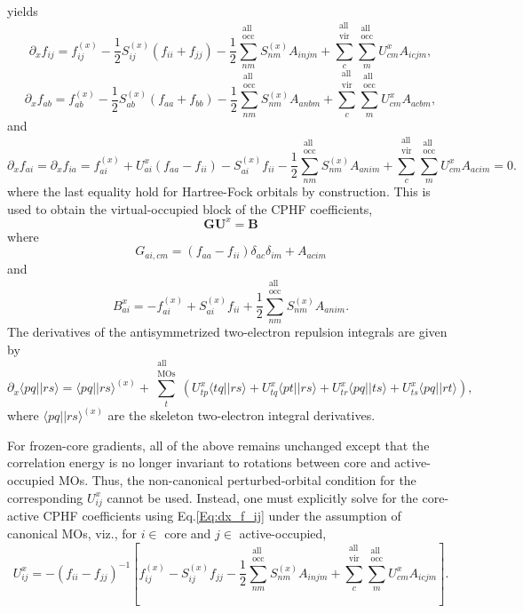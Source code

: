 \documentclass[12pt]{article}
\def\ket#1{| #1 \rangle}
\def\bra#1{\langle #1 |}
\def\aint#1#2{\bra{#1}\ket{#2}}
\newcommand{\allocc}{\substack{\textrm{all}{}\\\textrm{occ}}}
\newcommand{\allvir}{\substack{\textrm{all}{}\\\textrm{vir}}}
\newcommand{\allmos}{\substack{\textrm{all}{}\\\textrm{MOs}}}
\begin{document}
yields
\begin{equation}
\partial_x f_{ij} = f_{ij}^{(x)} - \frac{1}{2} S_{ij}^{(x)} (f_{ii} + f_{jj})
- \frac{1}{2} \sum_{nm}^{\allocc} S_{nm}^{(x)} A_{injm}
+ \sum_c^{\allvir} \sum_m^{\allocc} U_{cm}^x A_{icjm},
    \label{Eq:dx_f_ij}
\end{equation}
\begin{equation}
\partial_x f_{ab} = f_{ab}^{(x)} - \frac{1}{2} S_{ab}^{(x)} (f_{aa} + f_{bb})
- \frac{1}{2} \sum_{nm}^{\allocc} S_{nm}^{(x)} A_{anbm}
+ \sum_c^{\allvir} \sum_m^{\allocc} U_{cm}^x A_{acbm},
\end{equation}
and
\begin{equation}
\partial_x f_{ai} = \partial_x f_{ia} = f_{ai}^{(x)} + U_{ai}^x (f_{aa} - f_{ii}) - S_{ai}^{(x)} f_{ii} 
- \frac{1}{2} \sum_{nm}^{\allocc} S_{nm}^{(x)} A_{anim}
+ \sum_c^{\allvir} \sum_m^{\allocc} U_{cm}^x A_{acim} = 0.
\end{equation}
where the last equality hold for Hartree-Fock orbitals by construction.  This
is used to obtain the virtual-occupied block of the CPHF coefficients,
\begin{equation}
\mathbf{G} \mathbf{U}^x = \mathbf{B}
\end{equation}
where
\begin{equation}
G_{ai,cm} = (f_{aa} - f_{ii}) \delta_{ac} \delta_{im} + A_{acim}
\end{equation}
and
\begin{equation}
B_{ai}^x = -f_{ai}^{(x)} + S_{ai}^{(x)} f_{ii} + \frac{1}{2} \sum_{nm}^{\allocc} S_{nm}^{(x)} A_{anim}.
\end{equation}
The derivatives of the antisymmetrized two-electron repulsion integrals are
given by
\begin{equation}
\partial_x \aint{pq}{rs} = \aint{pq}{rs}^{(x)} + \sum_t^{\allmos} \left(
U_{tp}^x \aint{tq}{rs} + U_{tq}^x \aint{pt}{rs} + U_{tr}^x \aint{pq}{ts} + U_{ts}^x \aint{pq}{rt}
\right),
\end{equation}
where $\aint{pq}{rs}^{(x)}$ are the skeleton two-electron integral derivatives.

\vspace{0.2in}
\noindent
For frozen-core gradients, all of the above remains unchanged except that the correlation energy is no longer invariant to
rotations between core and active-occupied MOs. Thus, the non-canonical perturbed-orbital condition for the corresponding
$U_{ij}^x$ cannot be used.  Instead, one must explicitly solve for the core-active CPHF coefficients using
Eq.\eqref{Eq:dx_f_ij} under the assumption of canonical MOs, viz., for $i \in$ core and $j \in$ active-occupied,
\begin{equation}
U_{ij}^x = -(f_{ii} - f_{jj})^{-1} \left[ f_{ij}^{(x)} - S_{ij}^{(x)} f_{jj} - \frac{1}{2} \sum_{nm}^{\allocc}
S_{nm}^{(x)} A_{injm} +
\sum_c^{\allvir} \sum_m^{\allocc} U_{cm}^{x} A_{icjm}\right].
\end{equation}
\end{document}
